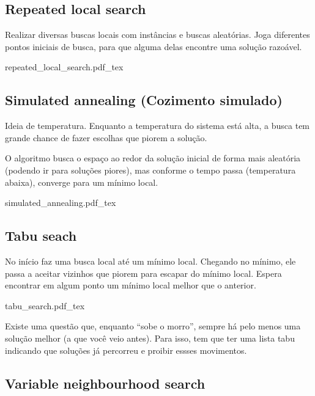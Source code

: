 \subsection{Repeated local search}

Realizar diversas buscas locais com instâncias e buscas aleatórias. Joga diferentes pontos iniciais de busca, para que alguma delas encontre uma solução razoável.

\begin{center}
    \def\svgwidth{.75\linewidth}
    {repeated_local_search.pdf_tex}
\end{center}

\newpage

\subsection{Simulated annealing (Cozimento simulado)}

Ideia de temperatura. Enquanto a temperatura do sistema está alta, a busca tem grande chance de fazer escolhas que piorem a solução.

O algoritmo busca o espaço ao redor da solução inicial de forma mais aleatória (podendo ir para soluções piores), mas conforme o tempo passa (temperatura abaixa), converge para um mínimo local.

\begin{center}
    \def\svgwidth{.75\linewidth}
    {simulated_annealing.pdf_tex}
\end{center}

\subsection{Tabu seach}

No início faz uma busca local até um mínimo local. Chegando no mínimo, ele passa a aceitar vizinhos que piorem para escapar do mínimo local. Espera encontrar em algum ponto um mínimo local melhor que o anterior.

\begin{center}
    \def\svgwidth{.75\linewidth}
    {tabu_search.pdf_tex}
\end{center}

Existe uma questão que, enquanto ``sobe o morro'', sempre há pelo menos uma solução melhor (a que você veio antes). Para isso, tem que ter uma lista tabu indicando que soluções já percorreu e proibir essses movimentos.

\subsection{Variable neighbourhood search}


